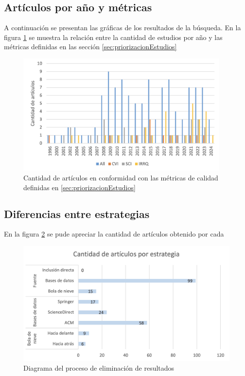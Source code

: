 

\subsection{Artículos por año y métricas}
\noindent
A continuación se presentan las gráficas de los resultados de la búsqueda. En la figura \ref{fig:plot-anios-vs-indices-calidad} se muestra la relación entre la cantidad de estudios por año y las métricas definidas en las sección \ref{sec:priorizacionEstudios}

\begin{figure}[H]
	\begin{center}
		\includegraphics[width=0.95\textwidth]{tablas-images/sms/plot-freq-indices.png}
	\end{center}
	\caption{Cantidad de artículos en conformidad con las métricas de calidad definidas en \ref{sec:priorizacionEstudios}}
	\label{fig:plot-anios-vs-indices-calidad}
\end{figure}



\subsection{Diferencias entre estrategias}

En la figura \ref{fig:plot-estrategia_vs_articulos} se pude apreciar la cantidad de artículos obtenido por cada

\begin{figure}[H]
	\centering
	\includegraphics[scale=0.3] {tablas-images/sms/plot-estrategia_vs_articulos.png}
	\caption{Diagrama del proceso de eliminación de resultados}\label{fig:plot-estrategia_vs_articulos}
\end{figure}

